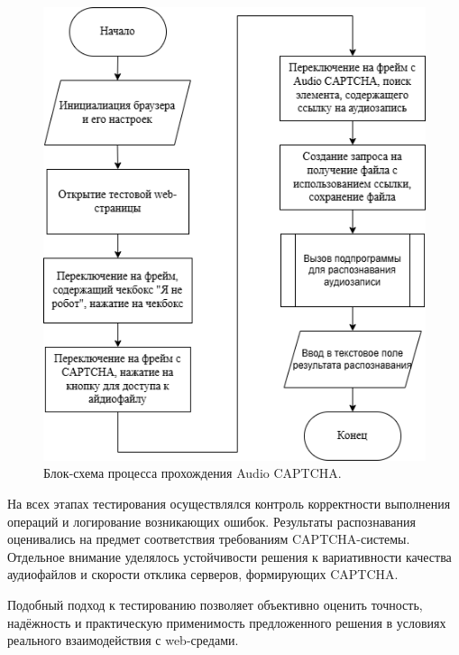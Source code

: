 \begin{figure}[H]
    \centering
    \includegraphics[width=0.6\linewidth]{imgs/audiocaptcha/captcha_solve.png}
    \caption{Блок-схема процесса прохождения Audio CAPTCHA.}
    \label{fig:audio-solver}
\end{figure}

На всех этапах тестирования осуществлялся контроль корректности выполнения 
операций и логирование возникающих ошибок. Результаты распознавания оценивались 
на предмет соответствия требованиям CAPTCHA-системы. Отдельное внимание уделялось 
устойчивости решения к вариативности качества аудиофайлов и скорости отклика 
серверов, формирующих CAPTCHA.

Подобный подход к тестированию позволяет объективно оценить точность, надёжность 
и практическую применимость предложенного решения в условиях реального 
взаимодействия с web-средами.

